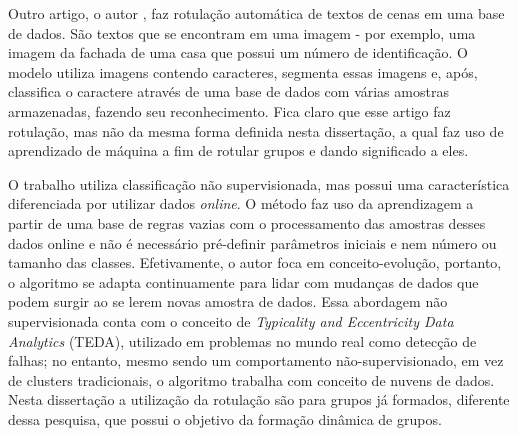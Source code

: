 Outro artigo, o autor \cite{Iwamura2013}, faz rotulação automática de textos de cenas em uma base de dados. São textos que se encontram em uma imagem - por exemplo, uma imagem da fachada de uma casa que possui um número de identificação. O modelo utiliza imagens contendo caracteres, segmenta essas imagens e, após, classifica o caractere através de uma base de dados com várias amostras armazenadas, fazendo seu reconhecimento. Fica claro que esse artigo faz rotulação, mas não da mesma forma definida nesta dissertação, a qual faz uso de aprendizado de máquina a fim de rotular grupos e dando significado a eles. 


O trabalho \cite{Costa2016} utiliza classificação não supervisionada, mas possui uma característica diferenciada por utilizar dados \textit{online}. O método faz uso da aprendizagem a partir de uma base de regras vazias com o processamento das amostras desses dados online e não é necessário pré-definir parâmetros iniciais e nem número ou tamanho das classes. Efetivamente, o autor foca em conceito-evolução, portanto, o algoritmo se adapta continuamente para lidar com mudanças de dados que podem surgir ao se lerem novas amostra de dados. Essa abordagem não supervisionada conta com o conceito de \textit{Typicality and Eccentricity Data Analytics} (TEDA), utilizado em problemas no mundo real como detecção de falhas; no entanto, mesmo sendo um comportamento não-supervisionado, em vez de clusters tradicionais, o algoritmo trabalha com conceito de nuvens de dados. Nesta dissertação a utilização da rotulação são para grupos já formados, diferente dessa pesquisa, que possui o objetivo da formação dinâmica de grupos.



